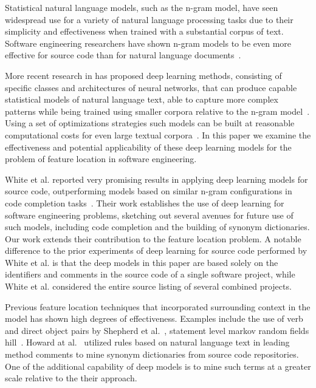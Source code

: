 


%
%
Statistical natural language models, such as the n-gram model, have
seen widespread use for a variety of natural language processing tasks
due to their simplicity and effectiveness when trained with a
substantial corpus of text. Software engineering researchers have
shown n-gram models to be even more effective for source code than for
natural language documents~\cite{hindle_naturalness_2012}. 


More recent research in has proposed deep learning methods, consisting
of specific classes and architectures of neural networks, that can
produce capable statistical models of natural language text, able to
capture more complex patterns while being trained using smaller
corpora relative to the n-gram
model~\cite{mikolov_distributed_2013}. Using a set of optimizations
strategies such models can be built at reasonable computational costs
for even large textual corpora~\cite{le_distributed_2014}. In this
paper we examine the effectiveness and potential applicability of
these deep learning models for the problem of feature location in
software engineering.



White et al. reported very promising results in applying deep learning
models for source code, outperforming models based on similar n-gram
configurations in code completion tasks~\cite{white-paper}. Their work
establishes the use of deep learning for software engineering
problems, sketching out several avenues for future use of such models,
including code completion and the building of synonym
dictionaries. Our work extends their contribution to the feature
location problem. A notable difference to the prior experiments of
deep learning for source code performed by White et al. is that the
deep models in this paper are based solely on the identifiers and
comments in the source code of a single software project, while White
et al. considered the entire source listing of several combined
projects.





Previous feature location techniques that incorporated surrounding
context in the model has shown high degrees of effectiveness. Examples
include the use of verb and direct object pairs by Shepherd et
al.~\cite{dave}, statement level markov random fields
hill~\cite{hill_use_2014}. Howard at al.~\cite{howard} utilized rules
based on natural language text in leading method comments to mine
synonym dictionaries from source code repositories. One of the
additional capability of deep models is to mine such terms at a
greater scale relative to the their approach.
